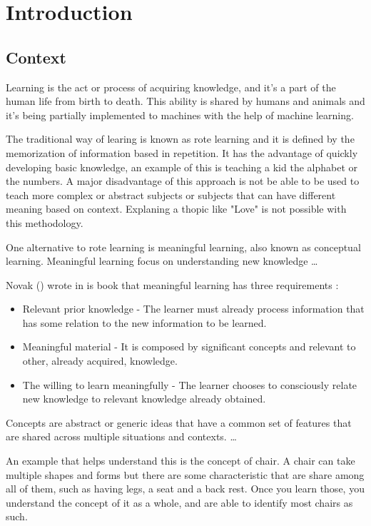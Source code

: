 % 
\chapter{Introduction} %
\label{chap:Chapter1} %

\section{Context}

Learning is the act or process of acquiring knowledge, and it's a part of the human life from birth to death.
This ability is shared by humans and animals and it's being partially implemented to machines with the help of machine learning.

The traditional way of learing is known as rote learning and it is defined by the memorization of information based in repetition.
It has the advantage of quickly developing basic knowledge, an example of this is teaching a kid the alphabet or the numbers.
A major disadvantage of this approach is not be able to be used to teach more complex or abstract subjects or subjects that can have different meaning based on context.
Explaning a thopic like "Love" is not possible with this methodology.

One alternative to rote learning is meaningful learning, also known as conceptual learning.
Meaningful learning focus on understanding new knowledge 
\dots

Novak (\citeyear{novak_2012}) wrote in is book that meaningful learning has three requirements : 

\begin{itemize}
    \item Relevant prior knowledge - The learner must already process information that has some relation to the new information to be learned.
    \item Meaningful material - It is composed by significant concepts and relevant to other, already acquired, knowledge.
    \item The willing to learn meaningfully - The learner chooses to consciously relate new knowledge to relevant knowledge already obtained.
\end{itemize}

Concepts are abstract or generic ideas that have a common set of features that are shared across multiple situations and contexts.
\dots

An example that helps understand this is the concept of chair.
A chair can take multiple shapes and forms but there are some characteristic that are share among all of them, such as having legs, a seat and a back rest.
Once you learn those, you understand the concept of it as a whole, and are able to identify most chairs as such.

